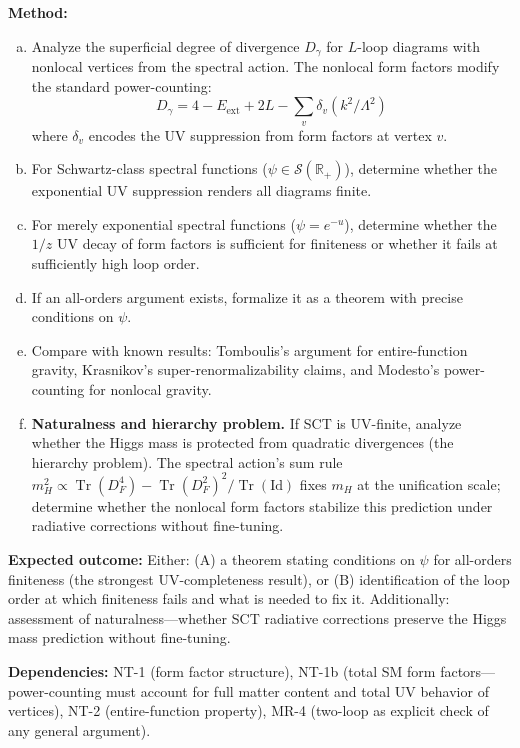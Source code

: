 \documentclass[12pt,a4paper]{article}
\newcommand{\Tr}{\operatorname{Tr}}
\newcommand{\method}[1]{\noindent\textbf{Method:} #1\par}
\newcommand{\outcome}[1]{\noindent\textbf{Expected outcome:} #1\par}
\newcommand{\deps}[1]{\noindent\textbf{Dependencies:} #1\par}
\begin{document}
\method{
\begin{enumerate}[(a)]
  \item Analyze the superficial degree of divergence $D_\gamma$ for
    $L$-loop diagrams with nonlocal vertices from the spectral action.
    The nonlocal form factors modify the standard power-counting:
    \begin{equation}
      D_\gamma = 4 - E_{\text{ext}} + 2L - \sum_v \delta_v(k^2/\Lambda^2)
    \end{equation}
    where $\delta_v$ encodes the UV suppression from form factors at vertex $v$.
  \item For Schwartz-class spectral functions ($\psi \in \mathcal{S}(\mathbb{R}_+)$),
    determine whether the exponential UV suppression renders all diagrams finite.
  \item For merely exponential spectral functions ($\psi = e^{-u}$), determine
    whether the $1/z$ UV decay of form factors is sufficient for finiteness
    or whether it fails at sufficiently high loop order.
  \item If an all-orders argument exists, formalize it as a theorem with
    precise conditions on $\psi$.
  \item Compare with known results: Tomboulis's argument for entire-function
    gravity, Krasnikov's super-renormalizability claims, and Modesto's
    power-counting for nonlocal gravity.
  \item \textbf{Naturalness and hierarchy problem.} If SCT is UV-finite,
    analyze whether the Higgs mass is protected from quadratic divergences
    (the hierarchy problem). The spectral action's sum rule
    $m_H^2 \propto \Tr(D_F^4) - \Tr(D_F^2)^2/\Tr(\text{Id})$ fixes
    $m_H$ at the unification scale; determine whether the nonlocal form
    factors stabilize this prediction under radiative corrections without
    fine-tuning.
\end{enumerate}
}

\outcome{Either: (A) a theorem stating conditions on $\psi$ for all-orders
finiteness (the strongest UV-completeness result), or (B) identification of
the loop order at which finiteness fails and what is needed to fix it.
Additionally: assessment of naturalness---whether SCT radiative corrections
preserve the Higgs mass prediction without fine-tuning.}

\deps{NT-1 (form factor structure), NT-1b (total SM form factors---power-counting
must account for full matter content and total UV behavior of vertices),
NT-2 (entire-function property),
MR-4 (two-loop as explicit check of any general argument).}
\end{document}
